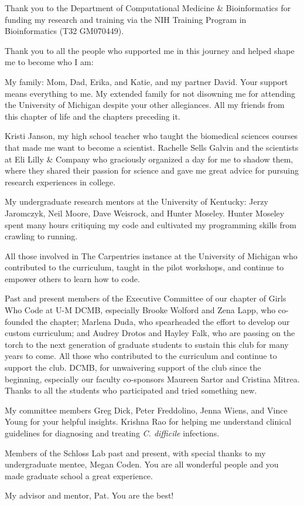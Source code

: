 Thank you to the Department of Computational Medicine \& Bioinformatics for
funding my research and training via the NIH Training Program in Bioinformatics
(T32 GM070449).

Thank you to all the people who supported me in this journey and helped shape me
to become who I am:

My family: Mom, Dad, Erika, and Katie, and my partner David.
Your support means everything to me.
My extended family for not disowning me for attending the University of Michigan
despite your other allegiances.
All my friends from this chapter of life and the chapters preceding it.

Kristi Janson, my high school teacher who taught the biomedical sciences
courses that made me want to become a scientist.
Rachelle Sells Galvin and the scientists at Eli Lilly \& Company
who graciously organized a day for me to shadow them,
where they shared their passion for science and gave me great advice for
pursuing research experiences in college.

My undergraduate research mentors at the University of Kentucky:
Jerzy Jaromczyk, Neil Moore, Dave Weisrock, and Hunter Moseley.
Hunter Moseley spent many hours critiquing my code and cultivated my programming
skills from crawling to running.

All those involved in The Carpentries instance at the University of Michigan who
contributed to the curriculum, taught in the pilot workshops, and continue to
empower others to learn how to code.

Past and present members of the Executive Committee of
our chapter of Girls Who Code at U-M DCMB, especially
Brooke Wolford and Zena Lapp, who co-founded the chapter;
Marlena Duda, who spearheaded the effort to develop our custom curriculum; and
Audrey Drotos and Hayley Falk, who are passing on the torch to the next
generation of graduate students to sustain this club for many years to come.
All those who contributed to the curriculum and continue to support the club.
DCMB, for unwaivering support of the club since the beginning, especially our
faculty co-sponsors Maureen Sartor and Cristina Mitrea.
Thanks to all the students who participated and tried something new.

My committee members Greg Dick, Peter Freddolino, Jenna Wiens, and Vince Young
for your helpful insights.
Krishna Rao for helping me understand clinical guidelines for diagnosing
and treating \textit{C. difficile} infections.

Members of the Schloss Lab past and present, with special thanks to my
undergraduate mentee, Megan Coden.
You are all wonderful people and you made graduate school a great experience.

My advisor and mentor, Pat. You are the best!
